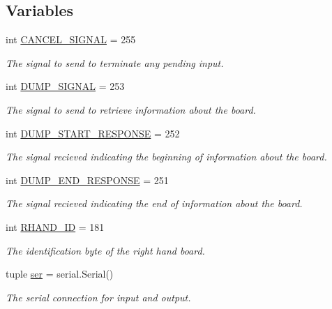 \subsection*{Variables}
\begin{DoxyCompactItemize}
\item 
\hypertarget{namespacerhand_a4802c9e7e608cd7ac3e72eb8762f33c9}{}int \hyperlink{namespacerhand_a4802c9e7e608cd7ac3e72eb8762f33c9}{C\+A\+N\+C\+E\+L\+\_\+\+S\+I\+G\+N\+A\+L} = 255\label{namespacerhand_a4802c9e7e608cd7ac3e72eb8762f33c9}

\begin{DoxyCompactList}\small\item\em The signal to send to terminate any pending input. \end{DoxyCompactList}\item 
int \hyperlink{namespacerhand_ad3b284028dfecade760db3a71725c916}{D\+U\+M\+P\+\_\+\+S\+I\+G\+N\+A\+L} = 253
\begin{DoxyCompactList}\small\item\em The signal to send to retrieve information about the board. \end{DoxyCompactList}\item 
\hypertarget{namespacerhand_a50a52db0cd5ff6fe5fd7ae972e3cc5fc}{}int \hyperlink{namespacerhand_a50a52db0cd5ff6fe5fd7ae972e3cc5fc}{D\+U\+M\+P\+\_\+\+S\+T\+A\+R\+T\+\_\+\+R\+E\+S\+P\+O\+N\+S\+E} = 252\label{namespacerhand_a50a52db0cd5ff6fe5fd7ae972e3cc5fc}

\begin{DoxyCompactList}\small\item\em The signal recieved indicating the beginning of information about the board. \end{DoxyCompactList}\item 
\hypertarget{namespacerhand_a17bf9a2ed2bdd5018087c90b66db86db}{}int \hyperlink{namespacerhand_a17bf9a2ed2bdd5018087c90b66db86db}{D\+U\+M\+P\+\_\+\+E\+N\+D\+\_\+\+R\+E\+S\+P\+O\+N\+S\+E} = 251\label{namespacerhand_a17bf9a2ed2bdd5018087c90b66db86db}

\begin{DoxyCompactList}\small\item\em The signal recieved indicating the end of information about the board. \end{DoxyCompactList}\item 
\hypertarget{namespacerhand_ac100acffde1fe70fad3c98cb961461b3}{}int \hyperlink{namespacerhand_ac100acffde1fe70fad3c98cb961461b3}{R\+H\+A\+N\+D\+\_\+\+I\+D} = 181\label{namespacerhand_ac100acffde1fe70fad3c98cb961461b3}

\begin{DoxyCompactList}\small\item\em The identification byte of the right hand board. \end{DoxyCompactList}\item 
tuple \hyperlink{namespacerhand_a55075d70ccd56b9f3addb4dec3331b32}{ser} = serial.\+Serial()
\begin{DoxyCompactList}\small\item\em The serial connection for input and output. \end{DoxyCompactList}\end{DoxyCompactItemize}


